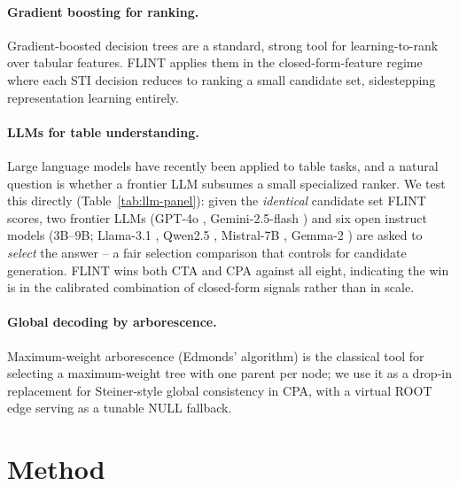 \documentclass[11pt]{article}
\begin{document}
\paragraph{Gradient boosting for ranking.} Gradient-boosted decision trees
\cite{gbdt} are a standard, strong tool for learning-to-rank over tabular features.
FLINT applies them in the closed-form-feature regime where each STI decision reduces
to ranking a small candidate set, sidestepping representation learning entirely.

\paragraph{LLMs for table understanding.} Large language models have recently been
applied to table tasks, and a natural question is whether a frontier LLM subsumes a
small specialized ranker. We test this directly (Table~\ref{tab:llm-panel}): given the
\emph{identical} candidate set FLINT scores, two frontier LLMs (GPT-4o
\cite{gpt4o}, Gemini-2.5-flash \cite{gemini}) and six open instruct models ($3$B--$9$B;
Llama-3.1 \cite{llama31}, Qwen2.5 \cite{qwen25}, Mistral-7B \cite{mistral7b}, Gemma-2
\cite{gemma2}) are asked to \emph{select} the answer -- a fair selection comparison that
controls for candidate generation. FLINT wins both CTA and CPA against all eight,
indicating the win is in the calibrated combination of closed-form signals rather than
in scale.

\paragraph{Global decoding by arborescence.} Maximum-weight arborescence (Edmonds'
algorithm) \cite{edmonds} is the classical tool for selecting a maximum-weight tree
with one parent per node; we use it as a drop-in replacement for Steiner-style
global consistency in CPA, with a virtual ROOT edge serving as a tunable NULL
fallback.

\section{Method}
\label{sec:method}
\end{document}

